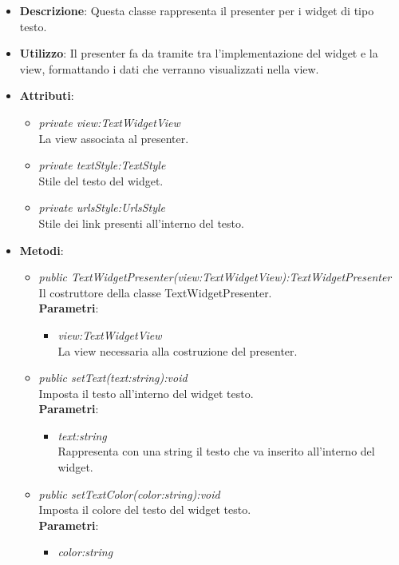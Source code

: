 \begin{itemize}
\item \textbf{Descrizione}: Questa classe rappresenta il presenter per i widget di tipo testo.
\item \textbf{Utilizzo}: Il presenter fa da tramite tra l'implementazione del widget e la view,  formattando i dati che verranno visualizzati nella view.
\item \textbf{Attributi}:
	\begin{itemize}
	\item \textit{private view:TextWidgetView}\\
	La view associata al presenter.
	\item \textit{private textStyle:TextStyle}\\
	Stile del testo del widget.
	\item \textit{private urlsStyle:UrlsStyle}\\
	Stile dei link presenti all'interno del testo.
	\end{itemize}
\item \textbf{Metodi}:
	\begin{itemize}
	\item \textit{public TextWidgetPresenter(view:TextWidgetView):TextWidgetPresenter}\\
	Il costruttore della classe TextWidgetPresenter.
		\\ \textbf{Parametri}: \begin{itemize}
		\item \textit{view:TextWidgetView}\\
		La view necessaria alla costruzione del presenter.
		\end{itemize} 
	\item \textit{public setText(text:string):void}\\
	Imposta il testo all'interno del widget testo.
		\\ \textbf{Parametri}: \begin{itemize}
		\item \textit{text:string}\\
		Rappresenta con una string il testo che va inserito all'interno del widget.
		\end{itemize} 
	\item \textit{public setTextColor(color:string):void}\\
	Imposta il colore del testo del widget testo.
		\\ \textbf{Parametri}: \begin{itemize}
		\item \textit{color:string}\\

\end{itemize}
\end{itemize}
\end{itemize}
